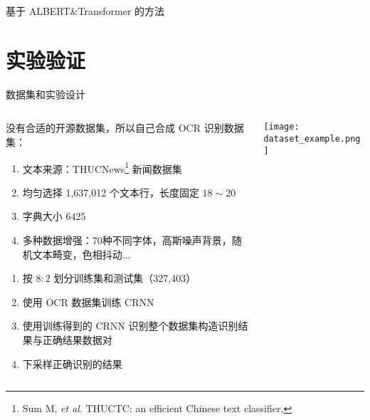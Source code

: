 \begin{frame}[c]{基于 ALBERT\&Transformer 的方法}
\end{frame}

\section{实验验证}

\begin{frame}[c]{数据集和实验设计}
	\begin{columns}[t]
		{\scriptsize
		\begin{column}[T]{5cm}
			没有合适的开源数据集，所以自己合成 OCR 识别数据集：
			\begin{enumerate}
				\item 文本来源：THUCNews\footnote{Sum M, \textit{et al}. THUCTC: an efficient Chinese text classifier.} 新闻数据集
				\item 均匀选择 1,637,012 个文本行，长度固定 $18 \sim 20$
				\item 字典大小 $6425$
				\item 多种数据增强：70种不同字体，高斯噪声背景，随机文本畸变，色相抖动...
			\end{enumerate}
			
			\begin{enumerate}
				\item 按 $8:2$ 划分训练集和测试集（327,403）
				\item 使用 OCR 数据集训练 CRNN
				\item 使用训练得到的 CRNN 识别整个数据集构造识别结果与正确结果数据对
				\item 下采样正确识别的结果
			\end{enumerate}
		\end{column}
		}%
		\begin{column}[T]{5cm}
			\texttt{[image: dataset\_example.png]}
		\end{column}
	\end{columns}
\end{frame}

